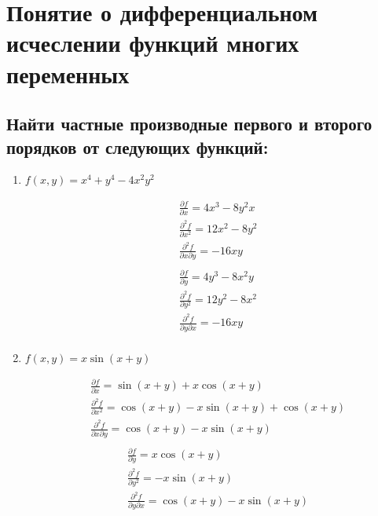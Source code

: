 \documentclass[a4paper, 12pt]{article}
\begin{document}
   \section{Понятие о дифференциальном исчеслении функций многих переменных}
   \subsection{Найти частные производные первого и второго порядков от следующих функций:}
   \begin{enumerate}
   
   \item %
$f(x, y) = x^4 + y^4 - 4x^2y^2$ \\
\begin{paracol}{2}
\begin{align*}
  &\frac{\partial f}{\partial x} = 4x^3 - 8y^2x \\
  &\frac{\partial^2 f}{\partial x^2} = 12x^2 - 8y^2 \\
  &\frac{\partial^2 f}{\partial x \partial y} = - 16xy \\
\end{align*}
\switchcolumn%
\begin{align*}
  &\frac{\partial f}{\partial y} = 4y^3 - 8x^2y \\
  &\frac{\partial^2 f}{\partial y^2} = 12y^2 - 8x^2 \\
  &\frac{\partial^2 f}{\partial y \partial x} = - 16xy \\
\end{align*}
\end{paracol}

  \item %
$f(x, y) = x\sin(x + y)$ \\
\begin{paracol}{2}
\begin{align*}
  &\frac{\partial f}{\partial x} = \sin(x+y) + x\cos(x+y) \\
  &\frac{\partial^2 f}{\partial x^2} = \cos(x+y) - x\sin(x+y) + \cos(x+y) \\
  &\frac{\partial^2 f}{\partial x \partial y} = \cos(x+y) - x\sin(x+y) \\
\end{align*}
\switchcolumn%
\begin{align*}
  &\frac{\partial f}{\partial y} = x\cos(x+y) \\
  &\frac{\partial^2 f}{\partial y^2} = -x\sin(x+y) \\
  &\frac{\partial^2 f}{\partial y \partial x} = \cos(x+y) - x\sin(x+y) \\
\end{align*}
\end{paracol}


\end{enumerate}
\end{document}
